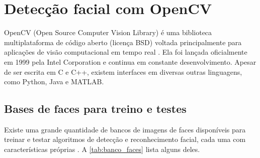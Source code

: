 \chapter{Detecção facial com OpenCV}\label{cap:opencv}


OpenCV (Open Source Computer Vision Library) é uma biblioteca multiplataforma de código aberto (licença BSD) voltada principalmente para aplicações de visão computacional em tempo real \cite{kaehler2016learning}. Ela foi lançada oficialmente em 1999 pela Intel Corporation e continua em constante desenvolvimento.
Apesar de ser escrita em C e C++, existem interfaces em diversas outras linguagens, como Python, Java e MATLAB.

\section{Bases de faces para treino e testes}\label{sec:banco_faces}

Existe uma grande quantidade de bancos de imagens de faces disponíveis para treinar e testar algoritmos de detecção e reconhecimento facial, cada uma com características próprias \cite{grgic2013face, huang2007labeled, mozaffari2011twins}. A \autoref{tab:banco_faces} lista alguns deles.

